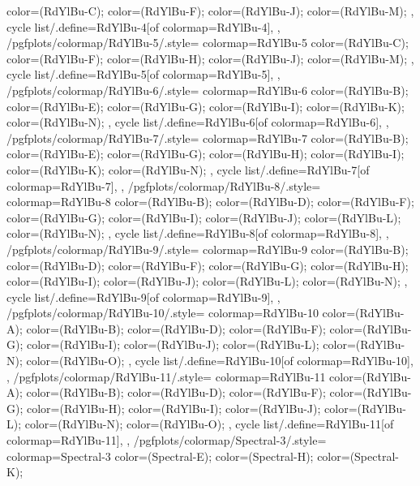 {{{      color=(RdYlBu-C);
      color=(RdYlBu-F);
      color=(RdYlBu-J);
      color=(RdYlBu-M);
    },
    cycle list/.define={RdYlBu-4}{[of colormap=RdYlBu-4]},
  },
  /pgfplots/colormap/RdYlBu-5/.style={
    colormap={RdYlBu-5}{
      color=(RdYlBu-C);
      color=(RdYlBu-F);
      color=(RdYlBu-H);
      color=(RdYlBu-J);
      color=(RdYlBu-M);
    },
    cycle list/.define={RdYlBu-5}{[of colormap=RdYlBu-5]},
  },
  /pgfplots/colormap/RdYlBu-6/.style={
    colormap={RdYlBu-6}{
      color=(RdYlBu-B);
      color=(RdYlBu-E);
      color=(RdYlBu-G);
      color=(RdYlBu-I);
      color=(RdYlBu-K);
      color=(RdYlBu-N);
    },
    cycle list/.define={RdYlBu-6}{[of colormap=RdYlBu-6]},
  },
  /pgfplots/colormap/RdYlBu-7/.style={
    colormap={RdYlBu-7}{
      color=(RdYlBu-B);
      color=(RdYlBu-E);
      color=(RdYlBu-G);
      color=(RdYlBu-H);
      color=(RdYlBu-I);
      color=(RdYlBu-K);
      color=(RdYlBu-N);
    },
    cycle list/.define={RdYlBu-7}{[of colormap=RdYlBu-7]},
  },
  /pgfplots/colormap/RdYlBu-8/.style={
    colormap={RdYlBu-8}{
      color=(RdYlBu-B);
      color=(RdYlBu-D);
      color=(RdYlBu-F);
      color=(RdYlBu-G);
      color=(RdYlBu-I);
      color=(RdYlBu-J);
      color=(RdYlBu-L);
      color=(RdYlBu-N);
    },
    cycle list/.define={RdYlBu-8}{[of colormap=RdYlBu-8]},
  },
  /pgfplots/colormap/RdYlBu-9/.style={
    colormap={RdYlBu-9}{
      color=(RdYlBu-B);
      color=(RdYlBu-D);
      color=(RdYlBu-F);
      color=(RdYlBu-G);
      color=(RdYlBu-H);
      color=(RdYlBu-I);
      color=(RdYlBu-J);
      color=(RdYlBu-L);
      color=(RdYlBu-N);
    },
    cycle list/.define={RdYlBu-9}{[of colormap=RdYlBu-9]},
  },
  /pgfplots/colormap/RdYlBu-10/.style={
    colormap={RdYlBu-10}{
      color=(RdYlBu-A);
      color=(RdYlBu-B);
      color=(RdYlBu-D);
      color=(RdYlBu-F);
      color=(RdYlBu-G);
      color=(RdYlBu-I);
      color=(RdYlBu-J);
      color=(RdYlBu-L);
      color=(RdYlBu-N);
      color=(RdYlBu-O);
    },
    cycle list/.define={RdYlBu-10}{[of colormap=RdYlBu-10]},
  },
  /pgfplots/colormap/RdYlBu-11/.style={
    colormap={RdYlBu-11}{
      color=(RdYlBu-A);
      color=(RdYlBu-B);
      color=(RdYlBu-D);
      color=(RdYlBu-F);
      color=(RdYlBu-G);
      color=(RdYlBu-H);
      color=(RdYlBu-I);
      color=(RdYlBu-J);
      color=(RdYlBu-L);
      color=(RdYlBu-N);
      color=(RdYlBu-O);
    },
    cycle list/.define={RdYlBu-11}{[of colormap=RdYlBu-11]},
  },
  /pgfplots/colormap/Spectral-3/.style={
    colormap={Spectral-3}{
      color=(Spectral-E);
      color=(Spectral-H);
      color=(Spectral-K);
}}}
